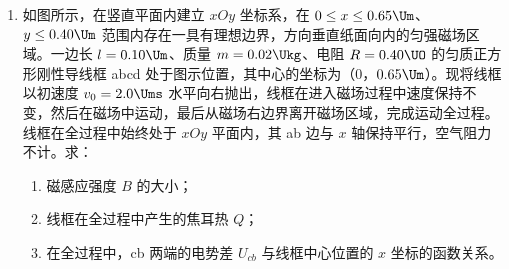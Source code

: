 \documentclass[\gkver]{gaokaozhenti}
\begin{document}
\begin{enumerate}
{	（2）当电子不再发生偏转时，电子受到的电场力与洛伦兹力平衡，由平衡条件得 $evB_{0}=eE_{H}$，由电势差定义知 $U_{0}=E_{H}b=\frac{1}{ne}\cdot\frac{IB_{0}}{d}$。

	（3）分析 $U_{H}-t$ 图像，霍尔电压与振幅有关。由（2）知 $U_{0}=\frac{1}{ne}\cdot\frac{IB_{0}}{d}$，则 $U=\frac{1}{ne}\cdot\frac{IB}{d}$，化简得 $\frac{U}{U_{0}}=\frac{B}{B_{0}}=1-\beta|x|=1-\alpha\beta|p|$，即霍尔电压 $U_{H}(t)=U_{0}(1-\alpha\beta|p|)$，解得 $|p|=\frac{1}{\alpha\beta}\left(1-\frac{U}{U_{0}}\right)$。当 $U=U_{1}$ 时，振幅最大，因此压力波的振幅为 $A=\frac{1}{\alpha\beta}\left(1-\frac{U_{1}}{U_{0}}\right)$。由表达式与图像可知周期为 $2t_{0}$，因此压力波的频率为 $f=\frac{1}{2t_{0}}$。
}

\item
如图所示，在竖直平面内建立 $xOy$ 坐标系，在 $0\leq x\leq0.65\Um$、$y\leq0.40\Um$ 范围内存在一具有理想边界，方向垂直纸面向内的匀强磁场区域。一边长 $l=0.10\Um$、质量 $m=0.02\Ukg$、电阻 $R=0.40\UO$ 的匀质正方形刚性导线框 abcd 处于图示位置，其中心的坐标为（0，$0.65\Um$）。现将线框以初速度 $v_{0}=2.0\Ums$ 水平向右抛出，线框在进入磁场过程中速度保持不变，然后在磁场中运动，最后从磁场右边界离开磁场区域，完成运动全过程。线框在全过程中始终处于 $xOy$ 平面内，其 ab 边与 $x$ 轴保持平行，空气阻力不计。求：
\begin{enumerate}
	\item
	磁感应强度 $B$ 的大小；
	\item
	线框在全过程中产生的焦耳热 $Q$；
	\item
	在全过程中，cb 两端的电势差 $U_{cb}$ 与线框中心位置的 $x$ 坐标的函数关系。
\end{enumerate}
\end{enumerate}
\end{document}
